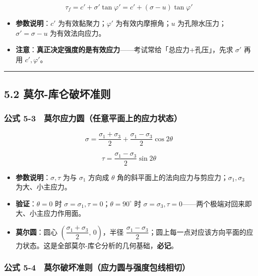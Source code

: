\documentclass[
]{article}
\providecommand{\tightlist}{%
  \setlength{\itemsep}{0pt}\setlength{\parskip}{0pt}}
\begin{document}
\[\tau_f=c'+\sigma'\tan\varphi'=c'+(\sigma-u)\tan\varphi'\]

\begin{itemize}
\tightlist
\item
  \textbf{参数说明}：\(c'\) 为有效黏聚力；\(\varphi'\)
  为有效内摩擦角；\(u\) 为孔隙水压力；\(\sigma'=\sigma-u\)
  为有效法向应力。
\item
  \textbf{注意}：\textbf{真正决定强度的是有效应力}------考试常给「总应力+孔压」，先求
  \(\sigma'\) 再用 \(c',\varphi'\)。
\end{itemize}

\begin{center}\rule{0.5\linewidth}{0.5pt}\end{center}

\subsection{5.2
莫尔-库仑破坏准则}\label{ux83abux5c14-ux5e93ux4ed1ux7834ux574fux51c6ux5219}

\subsubsection{公式
5-3　莫尔应力圆（任意平面上的应力状态）}\label{ux516cux5f0f-5-3-ux83abux5c14ux5e94ux529bux5706ux4efbux610fux5e73ux9762ux4e0aux7684ux5e94ux529bux72b6ux6001}

\[\sigma=\frac{\sigma_1+\sigma_3}{2}+\frac{\sigma_1-\sigma_3}{2}\cos 2\theta\]

\[\tau=\frac{\sigma_1-\sigma_3}{2}\sin 2\theta\]

\begin{itemize}
\tightlist
\item
  \textbf{参数说明}：\(\sigma,\tau\) 为与 \(\sigma_1\) 方向成 \(\theta\)
  角的斜平面上的法向应力与剪应力；\(\sigma_1,\sigma_3\) 为大、小主应力。
\item
  \textbf{验证}：\(\theta=0\) 时
  \(\sigma=\sigma_1,\tau=0\)；\(\theta=90^{\circ}\) 时
  \(\sigma=\sigma_3,\tau=0\)------两个极端对回来即大、小主应力作用面。
\item
  \textbf{莫尔圆}：圆心
  \(\left(\dfrac{\sigma_1+\sigma_3}{2},\,0\right)\)，半径
  \(\dfrac{\sigma_1-\sigma_3}{2}\)；圆上每一点对应该方向平面的应力状态。这是全部莫尔-库仑分析的几何基础，\textbf{必记}。
\end{itemize}

\subsubsection{公式
5-4　莫尔破坏准则（应力圆与强度包线相切）}\label{ux516cux5f0f-5-4-ux83abux5c14ux7834ux574fux51c6ux5219ux5e94ux529bux5706ux4e0eux5f3aux5ea6ux5305ux7ebfux76f8ux5207}
\end{document}

